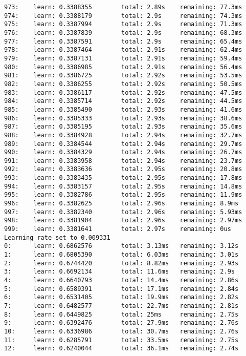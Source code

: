 \documentclass[11pt]{article}
\begin{document}
\begin{Verbatim}[commandchars=\\\{\}]
973:    learn: 0.3388355        total: 2.89s    remaining: 77.3ms
974:    learn: 0.3388179        total: 2.9s     remaining: 74.3ms
975:    learn: 0.3387994        total: 2.9s     remaining: 71.3ms
976:    learn: 0.3387839        total: 2.9s     remaining: 68.3ms
977:    learn: 0.3387591        total: 2.9s     remaining: 65.4ms
978:    learn: 0.3387464        total: 2.91s    remaining: 62.4ms
979:    learn: 0.3387131        total: 2.91s    remaining: 59.4ms
980:    learn: 0.3386985        total: 2.91s    remaining: 56.4ms
981:    learn: 0.3386725        total: 2.92s    remaining: 53.5ms
982:    learn: 0.3386255        total: 2.92s    remaining: 50.5ms
983:    learn: 0.3386117        total: 2.92s    remaining: 47.5ms
984:    learn: 0.3385714        total: 2.92s    remaining: 44.5ms
985:    learn: 0.3385490        total: 2.93s    remaining: 41.6ms
986:    learn: 0.3385333        total: 2.93s    remaining: 38.6ms
987:    learn: 0.3385195        total: 2.93s    remaining: 35.6ms
988:    learn: 0.3384928        total: 2.94s    remaining: 32.7ms
989:    learn: 0.3384544        total: 2.94s    remaining: 29.7ms
990:    learn: 0.3384329        total: 2.94s    remaining: 26.7ms
991:    learn: 0.3383958        total: 2.94s    remaining: 23.7ms
992:    learn: 0.3383636        total: 2.95s    remaining: 20.8ms
993:    learn: 0.3383435        total: 2.95s    remaining: 17.8ms
994:    learn: 0.3383157        total: 2.95s    remaining: 14.8ms
995:    learn: 0.3382786        total: 2.95s    remaining: 11.9ms
996:    learn: 0.3382625        total: 2.96s    remaining: 8.9ms
997:    learn: 0.3382340        total: 2.96s    remaining: 5.93ms
998:    learn: 0.3381904        total: 2.96s    remaining: 2.97ms
999:    learn: 0.3381641        total: 2.97s    remaining: 0us
Learning rate set to 0.009331
0:      learn: 0.6862576        total: 3.13ms   remaining: 3.12s
1:      learn: 0.6805390        total: 6.03ms   remaining: 3.01s
2:      learn: 0.6744420        total: 8.82ms   remaining: 2.93s
3:      learn: 0.6692134        total: 11.6ms   remaining: 2.9s
4:      learn: 0.6640793        total: 14.4ms   remaining: 2.86s
5:      learn: 0.6589391        total: 17.1ms   remaining: 2.84s
6:      learn: 0.6531405        total: 19.9ms   remaining: 2.82s
7:      learn: 0.6482577        total: 22.7ms   remaining: 2.81s
8:      learn: 0.6449825        total: 25ms     remaining: 2.75s
9:      learn: 0.6392476        total: 27.9ms   remaining: 2.76s
10:     learn: 0.6336986        total: 30.7ms   remaining: 2.76s
11:     learn: 0.6285791        total: 33.5ms   remaining: 2.75s
12:     learn: 0.6240044        total: 36.1ms   remaining: 2.74s

\end{Verbatim}
\end{document}
